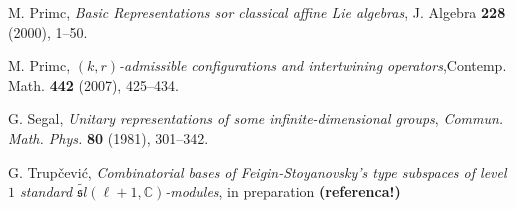 \documentclass[a4paper, 10pt,oneside]{amsart}
\begin{document}
\begin{thebibliography}{DLinM}
 M. Primc, \textit{ Basic Representations sor classical
affine Lie algebras}, J. Algebra {\bf 228} (2000), 1--50.

 M. Primc, \textit{ $(k,r)$-admissible configurations and intertwining
operators},Contemp. Math. {\bf 442} (2007), 425--434.

G. Segal,
\textit{Unitary representations of some infinite-dimensional
groups}, {\em Commun. Math. Phys.} {\bf 80} (1981), 301--342.

 G. Trup\v cevi\' c, \textit{Combinatorial bases of Feigin-Stoyanovsky's type subspaces of level $1$ standard $\tilde{{\mathfrak sl}}(\ell+1,{{\mathbb C}})$-modules}, in preparation {\bf (referenca!)}

\end{thebibliography}
\end{document}
